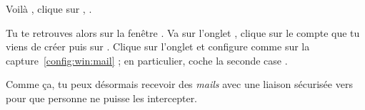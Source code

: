 Voil\`a , clique sur , .

Tu te retrouves alors sur la fen\^etre . Va sur
l'onglet , clique sur le compte que tu viens de cr\'eer
puis sur . Clique sur l'onglet  et
configure comme sur la capture~\ref{config:win:mail} ; en
particulier, coche la seconde case .

Comme \c{c}a, tu peux d\'esormais recevoir des \emph{mails} avec une liaison
s\'ecuris\'ee vers  pour que personne ne puisse les
intercepter.



%
%
%
%

